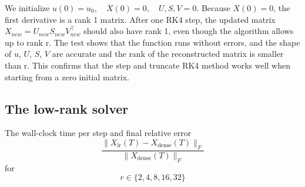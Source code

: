 \documentclass[11pt]{report}
\begin{document}
We initialize $u(0)=u_0, \quad X(0) =0, \quad U,S,V = 0$. Because $ X(0) =0$, the first derivative is a rank 1 matrix. After one RK4 step, the updated matrix $X_{new} = U_{new}S_{new}V_{new}^\top$ should also have rank 1, even though the algorithm allows up to rank r. The test shows that the function runs without errors, and the shape of $u$, $U$, $S$, $V$ are accurate and the rank of the reconstructed matrix is smaller than r. This confirms that the step and truncate RK4 method works well when starting from a zero initial matrix.

\subsection{The low-rank solver}

The wall-clock time per step and final relative error
\[
\frac{\|X_{\text{lr}}(T) - X_{\text{dense}}(T)\|_F}{\|X_{\text{dense}}(T)\|_F}
\]
for
\[
r \in \{2,4,8,16,32\}
\]
\end{document}
